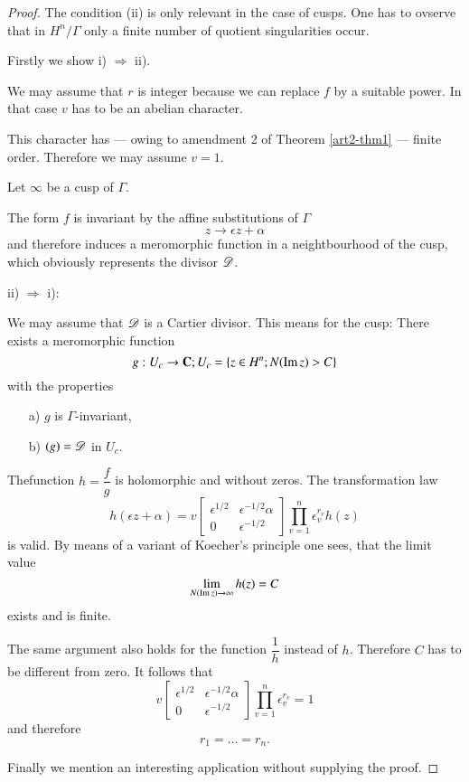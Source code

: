 \begin{proof}
The condition (ii) is only relevant in the case of cusps. One has to ovserve that in $H^n/\Gamma$ only a finite number of quotient singularities occur.

Firstly we show i) $\Rightarrow$ ii).

We may assume that $r$ is integer because we can replace $f$ by a suitable power. In that case $v$ has to be an abelian character.

This character has --- owing to amendment 2 of Theorem \ref{art2-thm1} --- finite order. Therefore we may assume $v =1$.

Let $\infty$ be a cusp of $\Gamma$.

The form $f$ is invariant by the affine substitutions of $\Gamma$
$$
z \to \epsilon z + \alpha
$$
and therefore induces a meromorphic function in a neightbourhood of the cusp, which obviously represents the divisor $\mathscr{D}$.

ii) $\Rightarrow$ i):

We may assume that $\mathscr{D}$ is a Cartier divisor. This means for the cusp: There exists a meromorphic function
$$
g : U_c \to \mathbf{C}; U_c = \{z \in H^n ; N (\operatorname{Im} z) > C\} 
$$
with the properties
\begin{itemize}
\item[a)] $g$ is $\Gamma$-invariant,

\item[b)] $(g) = \mathscr{D}$ in $U_c$.
\end{itemize}
The\pageoriginale function $h = \dfrac{f}{g}$ is holomorphic and without zeros. The transformation law
$$
h(\epsilon z + \alpha) = v 
\begin{bmatrix} 
\epsilon^{1/2} & \epsilon^{-1/2} \alpha\\
0 & \epsilon^{-1/2}
\end{bmatrix} \prod^n_{v=1} \epsilon^{r_v}_v h(z)
$$
is valid. By means of a variant of Koecher's principle one sees, that the limit value
$$
\lim\limits_{N (\operatorname{Im} z) \to \infty} h (z) = C
$$
exists and is finite.

The same argument also holds for the function $\dfrac{1}{h}$ instead of $h$.
Therefore $C$ has to be different from zero. It follows that
$$
v \begin{bmatrix}
\epsilon^{1/2} & \epsilon^{-1/2} \alpha\\
0 & \epsilon^{-1/2}
\end{bmatrix} \prod^n_{v=1} \epsilon^{r_v}_v = 1
$$
and therefore
$$
r_1 = \ldots = r_n.
$$

Finally we mention an interesting application without supplying the proof.
\end{proof}

